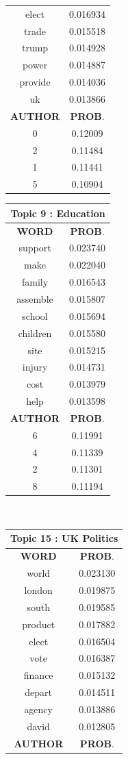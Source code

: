 \begin{table}[h!]
\begin{tabular}{|c c|}
	elect &   0.016934\\
	trade &   0.015518\\
	trump &   0.014928\\
	power &   0.014887\\
	provide &   0.014036\\
	uk &   0.013866\\[1ex] 
 \hline
  \textbf{AUTHOR} & \textbf{PROB}.  \\ [0.3ex] 
 \hline
0 &  0.12009\\
2 &  0.11484\\
1 &  0.11441\\
5  & 0.10904\\
 \hline
\end{tabular}
 \hfill
 \begin{tabular}{|c c|} 
\hline
\multicolumn{2}{|c|}{\textbf{Topic 9 : Education}} \\
\hline
 \textbf{WORD} & \textbf{PROB}.  \\ [0.3ex] 
 \hline
 support &  0.023740\\
	make  &    0.022040\\
	family   &   0.016543\\
	assemble  &   0.015807\\
	school   &   0.015694\\
	children  &    0.015580\\
	site   &   0.015215\\
	injury   &   0.014731\\
	cost   &   0.013979\\
	help   &   0.013598\\ [1ex] 
 \hline
  \textbf{AUTHOR} & \textbf{PROB}.  \\ [0.3ex] 
 \hline
 6 &  0.11991 \\ 
4  &    0.11339\\
2  &    0.11301\\
8  &    0.11194 \\ 
 \hline
\end{tabular}
\hfill
\\[1cm]
\begin{tabular}{|c c|} 
\hline
\multicolumn{2}{|c|}{\textbf{Topic 15 : UK Politics}} \\
\hline
 \textbf{WORD} & \textbf{PROB}.  \\ [0.3ex] 
 \hline
	world &  0.023130\\
	london &   0.019875\\
	south &   0.019585\\
	product &   0.017882\\
	elect &   0.016504\\
	vote &   0.016387\\
	finance &   0.015132\\
	depart &   0.014511\\
	agency &   0.013886\\
	david &   0.012805\\ [1ex] 
 \hline
  \textbf{AUTHOR} & \textbf{PROB}.  \\ [0.3ex] 
 \hline


\end{tabular}
\end{table}
